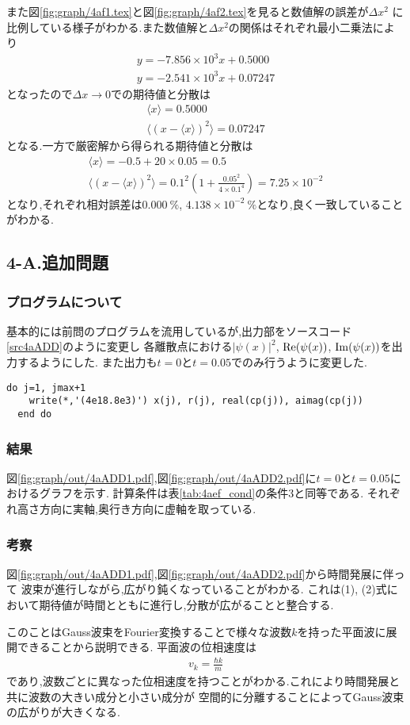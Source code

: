 また図\ref{fig:graph/4af1.tex}と図\ref{fig:graph/4af2.tex}を見ると数値解の誤差が$\Delta x^2$
に比例している様子がわかる.また数値解と$\Delta x^2$の関係はそれぞれ最小二乗法により
\begin{align}
  y=-7.856\times10^3x+0.5000\\
  y=-2.541\times10^3x+0.07247
\end{align}
となったので$\Delta x\rightarrow 0$での期待値と分散は
\begin{align}
  \langle x\rangle=0.5000\\
  \langle (x-\langle x\rangle)^2\rangle=0.07247
\end{align}
となる.一方で厳密解から得られる期待値と分散は
\begin{align}
  \langle x\rangle=-0.5+20\times0.05=0.5\\
  \langle (x-\langle x\rangle)^2\rangle=0.1^2\left(1+\frac{0.05^2}{4\times0.1^4}\right)=7.25\times10^{-2}
\end{align}
となり,それぞれ相対誤差は$0.000\ \%$, $4.138\times10^{-2}\ \%$となり,良く一致していることがわかる.
\newpage
\subsection*{4-A.追加問題}
\subsubsection*{プログラムについて}
基本的には前問のプログラムを流用しているが,出力部をソースコード\ref{src4aADD}のように変更し
各離散点における$|\psi(x)|^2$, ${\rm Re}(\psi(x))$, ${\rm Im}(\psi(x))$を出力するようにした.
また出力も$t=0$と$t=0.05$でのみ行うように変更した.
\begin{lstlisting}[caption=出力部の改変,label=src4aADD]
  do j=1, jmax+1
    write(*,'(4e18.8e3)') x(j), r(j), real(cp(j)), aimag(cp(j))
  end do
\end{lstlisting}
\subsubsection*{結果}
図\ref{fig:graph/out/4aADD1.pdf},図\ref{fig:graph/out/4aADD2.pdf}に$t=0$と$t=0.05$におけるグラフを示す.
計算条件は表\ref{tab:4aef_cond}の条件3と同等である.
それぞれ高さ方向に実軸,奥行き方向に虚軸を取っている.
\subsubsection*{考察}
図\ref{fig:graph/out/4aADD1.pdf},図\ref{fig:graph/out/4aADD2.pdf}から時間発展に伴って
波束が進行しながら,広がり鈍くなっていることがわかる.
これは(1), (2)式において期待値が時間とともに進行し,分散が広がることと整合する.

このことはGauss波束をFourier変換することで様々な波数$k$を持った平面波に展開できることから説明できる.
平面波の位相速度は
\begin{align}
  v_k=\frac{\hbar k}{m}
\end{align}
であり,波数ごとに異なった位相速度を持つことがわかる.これにより時間発展と共に波数の大きい成分と小さい成分が
空間的に分離することによってGauss波束の広がりが大きくなる.
